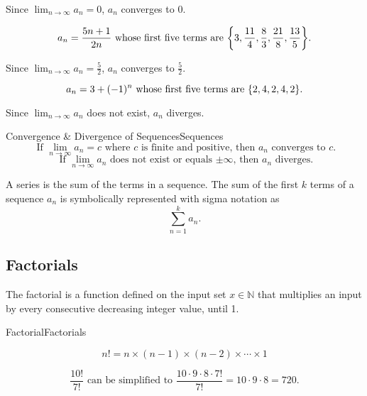 \documentclass[10pt]{article}
\theoremstyle{definition}
\DeclarePairedDelimiter{\curly}{\{}{\}}
\begin{document}
\begin{center}
    Since $\displaystyle\lim_{n \to \infty} a_n = 0$, $a_n$ converges to 0.
\end{center}

\[a_n  = \frac{5n+1}{2n} \text{ whose first five terms are } \curly*{3, \frac{11}{4}, \frac{8}{3}, \frac{21}{8}, \frac{13}{5}}.\]

\begin{center}
    Since $\displaystyle\lim_{n \to \infty} a_n = \frac{5}{2}$, $a_n$ converges to $\frac{5}{2}$.
\end{center}

\[a_n  = 3+(-1)^n \text{ whose first five terms are } \curly*{2, 4, 2, 4, 2}.\]

\begin{center}
    Since $\displaystyle\lim_{n \to \infty} a_n$ does not exist, $a_n$ diverges.
\end{center}

\vspace{0.5cm}

\begin{definition}{Convergence \& Divergence of Sequences}{Sequences}
\vspace{-0.5cm}
    \[ \text{ If } \lim_{n \to \infty} a_n = c \text{ where } c \text{ is finite and positive, then } a_n \text{ converges to } c. \]
    \vspace{-0.5cm}
    \[ \text{ If } \lim_{n \to \infty} a_n \text{ does not exist or equals $\pm \infty$, then } a_n \text{ diverges.}\]
\end{definition}

A series is the sum of the terms in a sequence. The sum of the first $k$ terms of a sequence $a_n$ is symbolically represented with sigma notation as \[\sum_{n=1}^{k} a_n.\]

\subsection{Factorials}

The factorial is a function defined on the input set $x \in \mathbb{N}$ that multiplies an input by every consecutive decreasing integer value, until 1.

\begin{definition}{Factorial}{Factorials}

\[n!=n\times(n-1)\times(n-2)\times \cdots \times 1\]
\end{definition}

\[\frac{10!}{7!} \text{ can be simplified to } \frac{10 \cdot 9 \cdot 8 \cdot 7!}{7!}=10\cdot9\cdot8=720.\]
\end{document}
